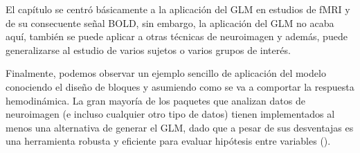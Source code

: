 El capítulo se centró básicamente a la aplicación del GLM en estudios de fMRI y de su consecuente señal BOLD, sin embargo, la aplicación del GLM no acaba aquí, también se puede aplicar a otras técnicas de neuroimagen y además, puede generalizarse al estudio de varios sujetos o varios grupos de interés.

Finalmente, podemos observar un ejemplo sencillo de aplicación del modelo conociendo el diseño de bloques y asumiendo como se va a comportar la respuesta hemodinámica. La gran mayoría de los paquetes que analizan datos de neuroimagen (e incluso cualquier otro tipo de datos) tienen implementados al menos una alternativa de generar el GLM, dado que a pesar de sus desventajas es una herramienta robusta y eficiente para evaluar hipótesis entre variables (\cite{monti2011statistical}).


% 
